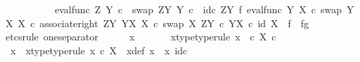 \begin{isabellebody}
\ \ \ \ \ \ \ \ \ \ {\isacharparenleft}{\kern0pt}eval{\isacharunderscore}{\kern0pt}func\ Z\ Y\ {\isasymcirc}\isactrlsub c\ \ swap\ {\isacharparenleft}{\kern0pt}Z\isactrlbsup Y\isactrlesup {\isacharparenright}{\kern0pt}\ Y\ {\isasymcirc}\isactrlsub c\ \ {\isacharparenleft}{\kern0pt}id\isactrlsub c\ {\isacharparenleft}{\kern0pt}Z\isactrlbsup Y\isactrlesup {\isacharparenright}{\kern0pt}\ {\isasymtimes}\isactrlsub f\ {\isacharparenleft}{\kern0pt}eval{\isacharunderscore}{\kern0pt}func\ Y\ X\ {\isasymcirc}\isactrlsub c\ swap\ {\isacharparenleft}{\kern0pt}Y\isactrlbsup X\isactrlesup {\isacharparenright}{\kern0pt}\ X{\isacharparenright}{\kern0pt}{\isacharparenright}{\kern0pt}\ {\isasymcirc}\isactrlsub c\ associate{\isacharunderscore}{\kern0pt}right\ {\isacharparenleft}{\kern0pt}Z\isactrlbsup Y\isactrlesup {\isacharparenright}{\kern0pt}\ {\isacharparenleft}{\kern0pt}Y\isactrlbsup X\isactrlesup {\isacharparenright}{\kern0pt}\ X\ {\isasymcirc}\isactrlsub c\ swap\ X\ {\isacharparenleft}{\kern0pt}Z\isactrlbsup Y\isactrlesup \ {\isasymtimes}\isactrlsub c\ Y\isactrlbsup X\isactrlesup {\isacharparenright}{\kern0pt}{\isacharparenright}{\kern0pt}\ {\isasymcirc}\isactrlsub c\ {\isacharparenleft}{\kern0pt}id\ {\isacharparenleft}{\kern0pt}X{\isacharparenright}{\kern0pt}\ \ {\isasymtimes}\isactrlsub f\ \ {\isasymlangle}f{\isacharcomma}{\kern0pt}g{\isasymrangle}{\isacharparenright}{\kern0pt}{\isachardoublequoteclose}\isanewline
\ \ \isamarkupfalse%
{\isacharparenleft}{\kern0pt}etcs{\isacharunderscore}{\kern0pt}rule\ one{\isacharunderscore}{\kern0pt}separator{\isacharparenright}{\kern0pt}\isanewline
\ \ \ \ \isamarkupfalse%
\ x{}\ \isanewline
\ \ \ \ \isamarkupfalse%
\ x{}{\isacharunderscore}{\kern0pt}type{\isacharbrackleft}{\kern0pt}type{\isacharunderscore}{\kern0pt}rule{\isacharbrackright}{\kern0pt}{\isacharcolon}{\kern0pt}\ {\isachardoublequoteopen}x{}\ \ {\isasymin}\isactrlsub c\ X\ {\isasymtimes}\isactrlsub c\ {\isasymone}{\isachardoublequoteclose}\isanewline
\ \ \ \ \isamarkupfalse%
\ \isamarkupfalse%
\ x\ \ x{\isacharunderscore}{\kern0pt}type{\isacharbrackleft}{\kern0pt}type{\isacharunderscore}{\kern0pt}rule{\isacharbrackright}{\kern0pt}{\isacharcolon}{\kern0pt}\ {\isachardoublequoteopen}x\ {\isasymin}\isactrlsub c\ X{\isachardoublequoteclose}\ \ x{\isacharunderscore}{\kern0pt}def{\isacharcolon}{\kern0pt}\ {\isachardoublequoteopen}x{}\ {\isacharequal}{\kern0pt}\ {\isasymlangle}x{\isacharcomma}{\kern0pt}\ id\isactrlsub c\ {\isasymone}{\isasymrangle}{\isachardoublequoteclose}\isanewline

\end{isabellebody}
